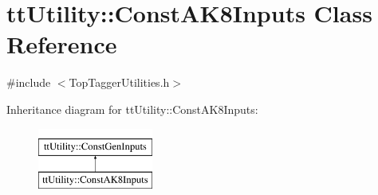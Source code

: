 \hypertarget{classttUtility_1_1ConstAK8Inputs}{\section{tt\-Utility\-:\-:Const\-A\-K8\-Inputs Class Reference}
\label{classttUtility_1_1ConstAK8Inputs}
}


{\ttfamily \#include $<$Top\-Tagger\-Utilities.\-h$>$}

Inheritance diagram for tt\-Utility\-:\-:Const\-A\-K8\-Inputs\-:\begin{figure}[H]
\begin{center}
\leavevmode
\includegraphics[height=2.000000cm]{classttUtility_1_1ConstAK8Inputs}
\end{center}
\end{figure}

